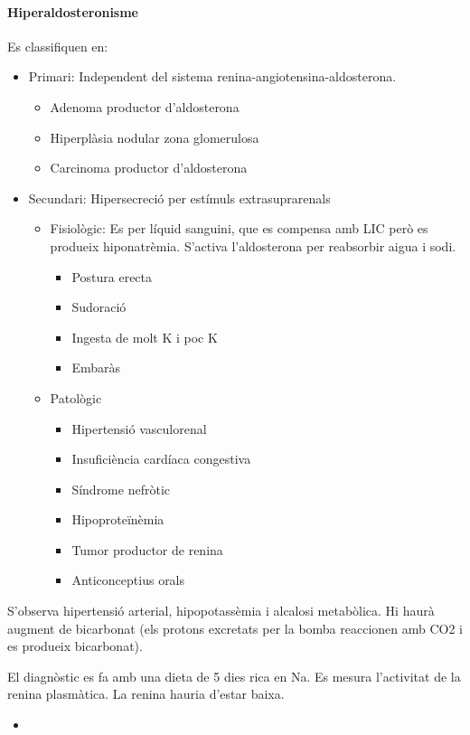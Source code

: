 \paragraph{Hiperaldosteronisme}
Es classifiquen en:
\begin{itemize}
\item Primari: Independent del sistema
  renina-angiotensina-aldosterona.
  \begin{itemize}
  \item  Adenoma productor d'aldosterona
  \item Hiperplàsia nodular zona glomerulosa
  \item Carcinoma productor d'aldosterona
  \end{itemize}

\item Secundari: Hipersecreció per estímuls extrasuprarenals
  \begin{itemize}
  \item Fisiològic: Es per líquid sanguini, que es compensa amb LIC
    però es produeix hiponatrèmia. S'activa l'aldosterona per
    reabsorbir aigua i sodi.
    \begin{itemize}
    \item Postura erecta
    \item Sudoració
    \item Ingesta de molt K i poc K
    \item Embaràs
    \end{itemize}
  
\item Patològic
    \begin{itemize}
    \item Hipertensió vasculorenal
    \item Insuficiència cardíaca congestiva
    \item Síndrome nefròtic
    \item Hipoproteïnèmia
    \item Tumor productor de renina 
    \item Anticonceptius orals
    \end{itemize}
  \end{itemize}
\end{itemize}

S'observa hipertensió arterial, hipopotassèmia i alcalosi
metabòlica. Hi haurà augment de bicarbonat (els protons excretats per
la bomba reaccionen amb CO2 i es produeix bicarbonat).

El diagnòstic es fa amb una dieta de 5 dies rica en Na. Es mesura
l'activitat de la renina plasmàtica. La renina hauria d'estar baixa.
\begin{itemize}
\item 
\end{itemize}

